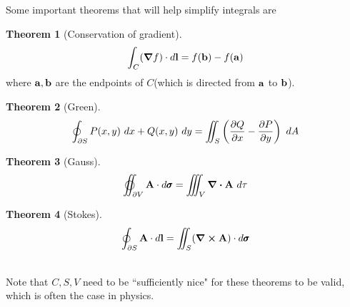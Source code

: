 \documentclass[10pt, a4paper]{extarticle}
\theoremstyle{definition}
\newtheorem{thm}{Theorem}
\numberwithin{equation}{subsection}
\begin{document}
Some important theorems that will help simplify integrals are
\begin{framed}
	\begin{thm}[Conservation of gradient]
		\begin{equation}\int_C(\grad f)\cdot d\vb{l}=f(\vb{b})-f(\vb{a})\end{equation}
		where $\vb{a}, \vb{b}$ are the endpoints of $C$(which is directed from $\vb{a}$ to $\vb{b}$).
	\end{thm}
	\begin{thm}[Green]
		\begin{equation}\oint_{\partial S}P(x,y)\ dx+Q(x,y)\ dy=\iint_S\left(\pdv{Q}{x}-\pdv{P}{y}\right)\ dA\end{equation}
	\end{thm}
	\begin{thm}[Gauss]
		\begin{equation}\varoiint_{\partial V} \vb{A}\cdot d\pmb{\sigma}=\iiint_V \div \vb{A}\ d\tau\end{equation}
	\end{thm}

	\begin{thm}[Stokes]
		\begin{equation}\oint_{\partial S} \vb{A}\cdot d\vb{l}=\iint_S (\curl\vb{A})\cdot d\pmb{\sigma}\end{equation}
	\end{thm}
	\hfill\\
	Note that $C,S,V$ need to be ``sufficiently nice" for these theorems to be valid, which is often the case in physics.
\end{framed}
\end{document}
